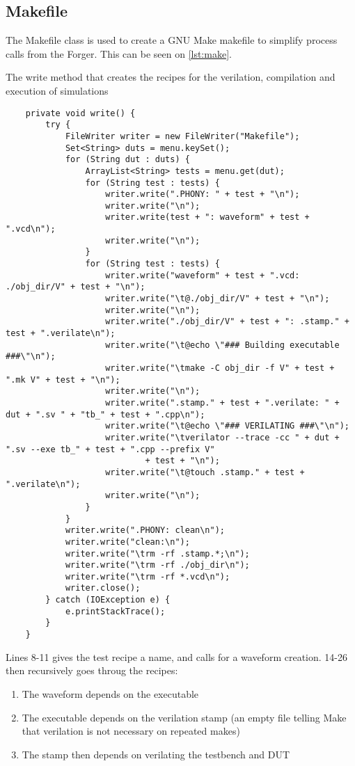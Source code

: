 \subsection{Makefile}
The Makefile class is used to create a GNU Make makefile to simplify process calls from the Forger. This can be seen on \cref{lst:make}.
\begin{listing}
    \centering
    \caption{The write method that creates the recipes for the verilation, compilation and execution of simulations}\label{lst:make}
    \begin{verbatim}
    private void write() {
        try {
            FileWriter writer = new FileWriter("Makefile");
            Set<String> duts = menu.keySet();
            for (String dut : duts) {
                ArrayList<String> tests = menu.get(dut);
                for (String test : tests) {
                    writer.write(".PHONY: " + test + "\n");
                    writer.write("\n");
                    writer.write(test + ": waveform" + test + ".vcd\n");
                    writer.write("\n");
                }
                for (String test : tests) {
                    writer.write("waveform" + test + ".vcd: ./obj_dir/V" + test + "\n");
                    writer.write("\t@./obj_dir/V" + test + "\n");
                    writer.write("\n");
                    writer.write("./obj_dir/V" + test + ": .stamp." + test + ".verilate\n");
                    writer.write("\t@echo \"### Building executable ###\"\n");
                    writer.write("\tmake -C obj_dir -f V" + test + ".mk V" + test + "\n");
                    writer.write("\n");
                    writer.write(".stamp." + test + ".verilate: " + dut + ".sv " + "tb_" + test + ".cpp\n");
                    writer.write("\t@echo \"### VERILATING ###\"\n");
                    writer.write("\tverilator --trace -cc " + dut + ".sv --exe tb_" + test + ".cpp --prefix V"
                            + test + "\n");
                    writer.write("\t@touch .stamp." + test + ".verilate\n");
                    writer.write("\n");
                }
            }
            writer.write(".PHONY: clean\n");
            writer.write("clean:\n");
            writer.write("\trm -rf .stamp.*;\n");
            writer.write("\trm -rf ./obj_dir\n");
            writer.write("\trm -rf *.vcd\n");
            writer.close();
        } catch (IOException e) {
            e.printStackTrace();
        }
    }
    \end{verbatim}
\end{listing}
Lines 8-11 gives the test recipe a name, and calls for a waveform creation. 14-26 then recursively goes throug the recipes:
\begin{enumerate}
    \item The waveform depends on the executable
    \item The executable depends on the verilation stamp (an empty file telling Make that verilation is not necessary on repeated makes)
    \item The stamp then depends on verilating the testbench and DUT
\end{enumerate}
